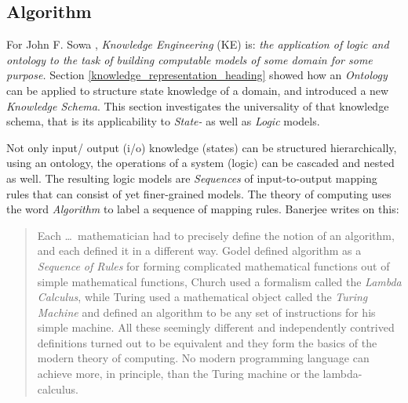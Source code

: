%
%
%
%
%
%
%

\subsection{Algorithm}
\label{algorithm_heading}

For John F. Sowa \cite{sowa}, \emph{Knowledge Engineering} (KE) is:
\textit{the application of logic and ontology to the task of building
computable models of some domain for some purpose.} Section
\ref{knowledge_representation_heading} showed how an \emph{Ontology} can be
applied to structure state knowledge of a domain, and introduced a new
\emph{Knowledge Schema}. This section investigates the universality of that
knowledge schema, that is its applicability to \emph{State-} as well as
\emph{Logic} models.

Not only input/ output (i/o) knowledge (states) can be structured
hierarchically, using an ontology, the operations of a system (logic) can be
cascaded and nested as well. The resulting logic models are \emph{Sequences} of
input-to-output mapping rules that can consist of yet finer-grained models. The
theory of computing uses the word \emph{Algorithm} to label a sequence of
mapping rules. Banerjee \cite{banerjee} writes on this:

\begin{quote}
    Each \ldots\ mathematician had to precisely define the notion of an
    algorithm, and each defined it in a different way. Godel defined algorithm
    as a \emph{Sequence of Rules} for forming complicated mathematical
    functions out of simple mathematical functions, Church used a formalism
    called the \emph{Lambda Calculus}, while Turing used a mathematical object
    called the \emph{Turing Machine} and defined an algorithm to be any set of
    instructions for his simple machine. All these seemingly different and
    independently contrived definitions turned out to be equivalent and they
    form the basics of the modern theory of computing. No modern programming
    language can achieve more, in principle, than the Turing machine or the
    lambda-calculus.
\end{quote}

